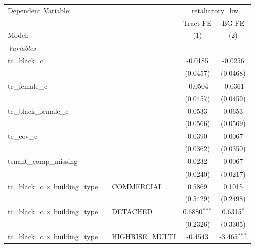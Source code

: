 \begin{tabular}{lcc}
   \tabularnewline \midrule \midrule
   Dependent Variable: & \multicolumn{2}{c}{retaliatory\_bw}\\
                                                                       & Tract FE       & BG FE \\   
   Model:                                                              & (1)            & (2)\\  
   \midrule
   \emph{Variables}\\
   tc\_black\_c                                                        & -0.0185        & -0.0256\\   
                                                                       & (0.0457)       & (0.0468)\\   
   tc\_female\_c                                                       & -0.0504        & -0.0361\\   
                                                                       & (0.0457)       & (0.0459)\\   
   tc\_black\_female\_c                                                & 0.0533         & 0.0653\\   
                                                                       & (0.0566)       & (0.0569)\\   
   tc\_cov\_c                                                          & 0.0390         & 0.0067\\   
                                                                       & (0.0362)       & (0.0350)\\   
   tenant\_comp\_missing                                               & 0.0232         & 0.0067\\   
                                                                       & (0.0240)       & (0.0217)\\   
   tc\_black\_c $\times$ building\_type $=$ COMMERCIAL                 & 0.5869         & 0.1015\\   
                                                                       & (0.5429)       & (0.2498)\\   
   tc\_black\_c $\times$ building\_type $=$ DETACHED                   & 0.6880$^{***}$ & 0.6315$^{*}$\\   
                                                                       & (0.2326)       & (0.3305)\\   
   tc\_black\_c $\times$ building\_type $=$ HIGHRISE\_MULTI            & -0.4543        & -3.465$^{***}$\\   

\end{tabular}
